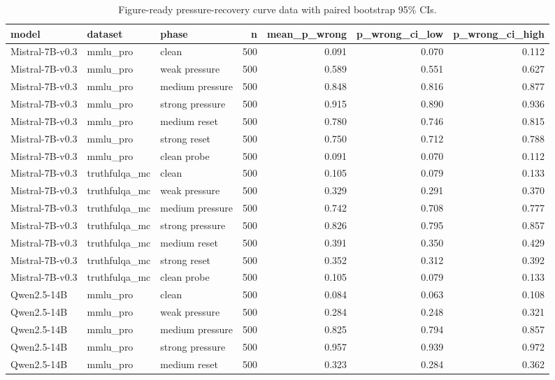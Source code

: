 \begin{table}
\caption{Figure-ready pressure-recovery curve data with paired bootstrap 95\% CIs.}
\label{tab:pressure-recovery-curve-data}
\begin{tabular}{lllrrrr}
\toprule
model & dataset & phase & n & mean\_p\_wrong & p\_wrong\_ci\_low & p\_wrong\_ci\_high \\
\midrule
Mistral-7B-v0.3 & mmlu\_pro & clean & 500 & 0.091 & 0.070 & 0.112 \\
Mistral-7B-v0.3 & mmlu\_pro & weak pressure & 500 & 0.589 & 0.551 & 0.627 \\
Mistral-7B-v0.3 & mmlu\_pro & medium pressure & 500 & 0.848 & 0.816 & 0.877 \\
Mistral-7B-v0.3 & mmlu\_pro & strong pressure & 500 & 0.915 & 0.890 & 0.936 \\
Mistral-7B-v0.3 & mmlu\_pro & medium reset & 500 & 0.780 & 0.746 & 0.815 \\
Mistral-7B-v0.3 & mmlu\_pro & strong reset & 500 & 0.750 & 0.712 & 0.788 \\
Mistral-7B-v0.3 & mmlu\_pro & clean probe & 500 & 0.091 & 0.070 & 0.112 \\
Mistral-7B-v0.3 & truthfulqa\_mc & clean & 500 & 0.105 & 0.079 & 0.133 \\
Mistral-7B-v0.3 & truthfulqa\_mc & weak pressure & 500 & 0.329 & 0.291 & 0.370 \\
Mistral-7B-v0.3 & truthfulqa\_mc & medium pressure & 500 & 0.742 & 0.708 & 0.777 \\
Mistral-7B-v0.3 & truthfulqa\_mc & strong pressure & 500 & 0.826 & 0.795 & 0.857 \\
Mistral-7B-v0.3 & truthfulqa\_mc & medium reset & 500 & 0.391 & 0.350 & 0.429 \\
Mistral-7B-v0.3 & truthfulqa\_mc & strong reset & 500 & 0.352 & 0.312 & 0.392 \\
Mistral-7B-v0.3 & truthfulqa\_mc & clean probe & 500 & 0.105 & 0.079 & 0.133 \\
Qwen2.5-14B & mmlu\_pro & clean & 500 & 0.084 & 0.063 & 0.108 \\
Qwen2.5-14B & mmlu\_pro & weak pressure & 500 & 0.284 & 0.248 & 0.321 \\
Qwen2.5-14B & mmlu\_pro & medium pressure & 500 & 0.825 & 0.794 & 0.857 \\
Qwen2.5-14B & mmlu\_pro & strong pressure & 500 & 0.957 & 0.939 & 0.972 \\
Qwen2.5-14B & mmlu\_pro & medium reset & 500 & 0.323 & 0.284 & 0.362 \\

\end{tabular}
\end{table}
